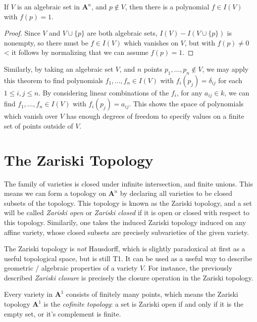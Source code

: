 \begin{corollary}
    If $V$ is an algebraic set in $\mathbf{A}^n$, and $p \not \in V$, then there is a polynomial $f \in I(V)$ with $f(p) = 1$.
\end{corollary}
\begin{proof}
    Since $V$ and $V \cup \{ p \}$ are both algebraic sets, $I(V) - I(V \cup \{ p \})$ is nonempty, so there must be $f \in I(V)$ which vanishes on $V$, but with $f(p) \neq 0$< it follows by normalizing that we can assume $f(p) = 1$.
\end{proof}

Similarly, by taking an algebraic set $V$, and $n$ points $p_1, \dots, p_n \not \in V$, we may apply this theorem to find polynomials $f_1, \dots, f_n \in I(V)$ with $f_i(p_j) = \delta_{ij}$ for each $1 \leq i,j \leq n$. By considering linear combinations of the $f_i$, for any $a_{ij} \in k$, we can find $f_1, \dots, f_n \in I(V)$ with $f_i(p_j) = a_{ij}$. This shows the space of polynomials which vanish over $V$ has enough degrees of freedom to specify values on a finite set of points outside of $V$.

\section{The Zariski Topology}

The family of varieties is closed under infinite intersection, and finite unions. This means we can form a topology on $\mathbf{A}^n$ by declaring all varieties to be closed subsets of the topology. This topology is known as the Zariski topology, and a set will be called \emph{Zariski open} or \emph{Zariski closed} if it is open or closed with respect to this topology. Similarily, one takes the induced Zariski topology induced on any affine variety, whose closed subsets are precisely subvarieties of the given variety.

The Zariski topology is \emph{not} Hausdorff, which is slightly paradoxical at first as a useful topological space, but is still T1. It can be used as a useful way to describe geometric / algebraic properties of a variety $V$. For instance, the previously described \emph{Zariski closure} is precisely the closure operation in the Zariski topology.

\begin{example}
    Every variety in $\mathbf{A}^1$ consists of finitely many points, which means the Zariski topology $\mathbf{A}^1$ is the \emph{cofinite topology}: a set is Zariski open if and only if it is the empty set, or it's complement is finite.
\end{example}

